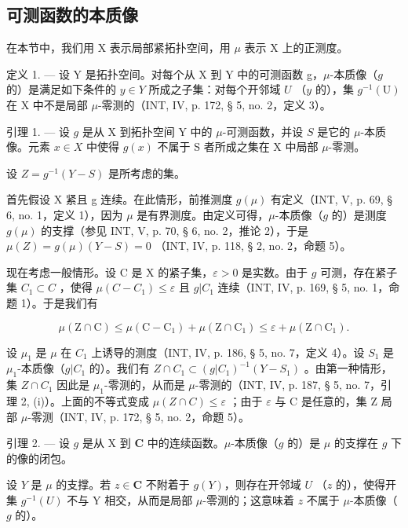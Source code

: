 \subsection{可测函数的本质像}

在本节中，我们用 X 表示局部紧拓扑空间，用 \(\mu\) 表示 X 上的正测度。

定义 1. --- 设 Y 是拓扑空间。对每个从 X 到 Y 中的可测函数 g，\(\mu\)-本质像（\(g\) 的）是满足如下条件的 \(y \in Y\) 所成之子集：对每个开邻域 \(U\) （\(y\) 的），集 \(g^{-1}(\mathrm{U})\) 在 X 中不是局部 \(\mu\)-零测的（INT, IV, p. 172, § 5, no. 2，定义 3）。

引理 1. --- 设 \(g\) 是从 X 到拓扑空间 Y 中的 \(\mu\)-可测函数，并设 \(S\) 是它的 \(\mu\)-本质像。元素 \(x \in X\) 中使得 \(g(x)\) 不属于 S 者所成之集在 X 中局部 \(\mu\)-零测。

设 \(Z = g^{-1}(Y - S)\) 是所考虑的集。

首先假设 X 紧且 g 连续。在此情形，前推测度 \(g(\mu)\) 有定义（INT, V, p. 69, § 6, no. 1，定义 1），因为 \(\mu\) 是有界测度。由定义可得，\(\mu\)-本质像（\(g\) 的）是测度 \(g(\mu)\) 的支撑（参见 INT, V, p. 70, § 6, no. 2，推论 2），于是 \(\mu(Z) = g(\mu)(Y - S) = 0\) （INT, IV, p. 118, § 2, no. 2，命题 5）。

现在考虑一般情形。设 C 是 X 的紧子集，\(\varepsilon > 0\) 是实数。由于 \(g\) 可测，存在紧子集 \(C_1 \subset C\) ，使得 \(\mu(C - C_1) \leqslant \varepsilon\) 且 \(g|C_1\) 连续（INT, IV, p. 169, § 5, no. 1，命题 1）。于是我们有

\[
\mu (\mathrm{Z} \cap \mathrm{C}) \leqslant \mu (\mathrm{C} - \mathrm{C} _ {1}) + \mu (\mathrm{Z} \cap \mathrm{C} _ {1}) \leqslant \varepsilon + \mu (\mathrm{Z} \cap \mathrm{C} _ {1}).
\]

设 \(\mu_{1}\) 是 \(\mu\) 在 \(C_{1}\) 上诱导的测度（INT, IV, p. 186, § 5, no. 7，定义 4）。设 \(S_{1}\) 是 \(\mu_{1}\)-本质像（\(g|C_{1}\) 的）。我们有 \(Z\cap C_{1}\subset(g|C_{1})^{-1}(Y-S_{1})\) 。由第一种情形，集 \(Z\cap C_{1}\) 因此是 \(\mu_{1}\)-零测的，从而是 \(\mu\)-零测的（INT, IV, p. 187, § 5, no. 7，引理 2, (i)）。上面的不等式变成 \(\mu(Z\cap C)\leqslant\varepsilon\) ；由于 \(\varepsilon\) 与 C 是任意的，集 Z 局部 \(\mu\)-零测（INT, IV, p. 172, § 5, no. 2，命题 5）。

引理 2. --- 设 \(g\) 是从 X 到 \(\mathbf{C}\) 中的连续函数。\(\mu\)-本质像（\(g\) 的）是 \(\mu\) 的支撑在 \(g\) 下的像的闭包。

设 \(Y\) 是 \(\mu\) 的支撑。若 \(z \in \mathbf{C}\) 不附着于 \(g(Y)\)，则存在开邻域 \(U\) （\(z\) 的），使得开集 \(g^{-1}(U)\) 不与 Y 相交，从而是局部 \(\mu\)-零测的；这意味着 \(z\) 不属于 \(\mu\)-本质像（\(g\) 的）。

